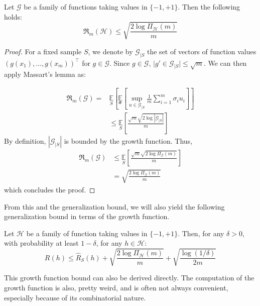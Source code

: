 \begin{col}\label{col:what}
    Let $\mathcal{G}$ be a family of functions taking values in $\{-1, + 1\}$. Then the following holds: 
    \begin{equation}
        \mathfrak{R}_{m}(\mathcal{H}) \leq \sqrt{\frac{2\log{\Pi_{\mathcal{H}}(m)}}{m}}
    \end{equation}
\end{col}
\begin{proof}
    For a fixed sample $S$, we denote by $\mathcal{G}_{|S}$ the set of vectors of function values $(g(x_1),\dots,g(x_m))^{\top}$ for $g\in \mathcal{G}$. Since $g\in \mathcal{G}$, $\lvert g'\in \mathcal{G}_{|S} \rvert \leq \sqrt{m}$. We can then apply Massart's lemma as: 

    \begin{equation}
        \begin{split}
            \mathfrak{R}_{m}(\mathcal{G}) =& \underset{S}{\mathbb{E}} \left[ \underset{\bm{\sigma}}{\mathbb{E}} \left[ \sup_{u\in \mathcal{G}_{|S}} \frac{1}{m} \sum^{m}_{i=1} \sigma_{i} u_{i} \right] \right]\\
            & \leq \underset{S}{\mathbb{E}} \left[\frac{\sqrt{m}\sqrt{2\log{|\mathcal{G}_{|S}|}}}{m}\right]
        \end{split}
    \end{equation}
    By definition, $|\mathcal{G}_{|S}|$ is bounded by the growth function. Thus, 
    \begin{equation}
        \begin{split}
            \mathfrak{R}_{m}(\mathcal{G}) &\leq \underset{S}{\mathbb{E}} \left[\frac{\sqrt{m}\sqrt{2\log{\Pi_{\mathcal{G}}(m) }}}{m}\right] \\
            & = \sqrt{\frac{2\log{\Pi_{\mathcal{G}} (m)}}{m}}
        \end{split}
    \end{equation}
    which concludes the proof. 
\end{proof}
From this and the generalization bound, we will also yield the following generalization bound in terms of the growth function. 
\begin{col}
    Let $\mathcal{H}$ be a family of function taking values in $\{-1,+1\}$. Then, for any $\delta > 0$, with probability at least $1-\delta$, for any $h\in \mathcal{H}$: 
    \begin{equation}
        R(h) \leq \hat{R}_{S}(h) + \sqrt{\frac{2\log{\Pi_{\mathcal{H}}(m)}}{m}} + \sqrt{\frac{\log{(1/\delta)}}{2m}}
    \end{equation}
\end{col}
This growth function bound can also be derived directly. The computation of the growth function is also, pretty weird, and is often not always convenient, especially because of its combinatorial nature. 

